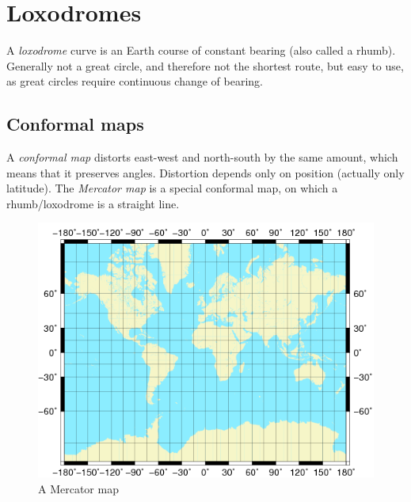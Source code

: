 \section{Loxodromes}

A \emph{loxodrome} curve is an Earth course of constant bearing (also called a rhumb). Generally not a great circle, and therefore not the shortest route, but easy to use, as great circles require continuous change of bearing.

\subsection{Conformal maps}

A \emph{conformal map} distorts east-west and north-south by the same amount, which means that it preserves angles. Distortion depends only on position (actually only latitude). The \emph{Mercator map} is a special conformal map, on which a rhumb/loxodrome is a straight line.

\begin{figure}[htbp]
	\centering
	\includegraphics[width=\linewidth]{img/esa_mercator_map}
	\caption{A Mercator map}
\end{figure}

